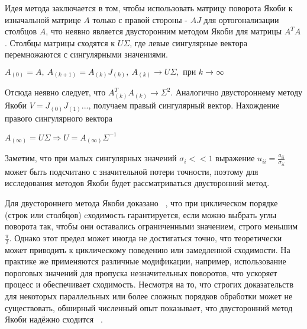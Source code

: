 Идея метода заключается в том, чтобы использовать матрицу поворота Якоби к изначальной матрице $A$ только с правой стороны - $AJ$ для ортогонализации столбцов $A$, что неявно является двусторонним методом Якоби для матрицы $A^TA$.
Столбцы матрицы сходятся к $U\Sigma$, где левые сингулярные вектора перемножаются с сингулярными значениями.
\begin{center}
     $A_{(0)}=A,\ A_{(k+1)} = A_{(k)}J_{(k)},\ A_{(k)} \longrightarrow U\Sigma, \text{ при } k\to\infty$
 \end{center}
 Отсюда неявно следует, что $A^T_{(k)}A_{(k)} \to \Sigma^2$. Аналогично двустороннему методу Якоби $V = J_{(0)}J_{(1)}...$, получаем правый сингулярный вектор. Нахождение правого сингулярного вектора 
 \begin{center}
     $A_{(\infty)} = U\Sigma \Rightarrow U = A_{(\infty)}\Sigma^{-1}$
 \end{center}
 Заметим, что при малых сингулярных значений $\sigma_i<<1$ выражение $u_{ii} = \frac{a_{ii}}{\sigma_{ii}}$ может быть подсчитано с значительной потери точности, поэтому для исследования методов Якоби будет рассматриваться двусторонний метод.

Для двустороннего метода Якоби доказано ~\cite{Forsythe1960}, что при циклическом порядке (строк или столбцов) cходимость гарантируется, если можно выбрать углы поворота так, чтобы они оставались ограниченными значением, строго меньшим $\frac{\pi}{2}$. Однако этот предел может иногда не достигаться точно, что теоретически может приводить к циклическому поведению или замедленной сходимости. На практике же применяются различные модификации, например, использование пороговых значений для пропуска незначительных поворотов, что ускоряет процесс и обеспечивает сходимость. Несмотря на то, что строгих доказательств для некоторых параллельных или более сложных порядков обработки может не существовать, обширный численный опыт показывает, что двусторонний метод Якоби надёжно сходится ~\cite{Dongarra2018}.

